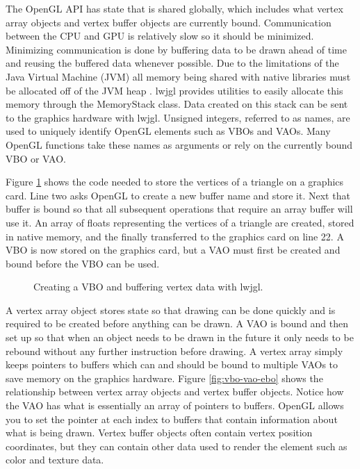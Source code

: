 \documentclass{article}
\begin{document}
The OpenGL API has state that is shared globally, which includes what vertex array objects and vertex buffer objects are currently bound. Communication between the CPU and GPU is relatively slow so it should be minimized. Minimizing communication is done by buffering data to be drawn ahead of time and reusing the buffered data whenever possible. Due to the limitations of the Java Virtual Machine (JVM) all memory being shared with native libraries must be allocated off of the JVM heap \cite{lwjglwiki}. lwjgl provides utilities to easily allocate this memory through the MemoryStack class. Data created on this stack can be sent to the graphics hardware with lwjgl. Unsigned integers, referred to as names, are used to uniquely identify OpenGL elements such as VBOs and VAOs. Many OpenGL functions take these names as arguments or rely on the currently bound VBO or VAO.

Figure \ref{fig:create-vbo} shows the code needed to store the vertices of a triangle on a graphics card. Line two asks OpenGL to create a new buffer name and store it. Next that buffer is bound so that all subsequent operations that require an array buffer will use it. An array of floats representing the vertices of a triangle are created, stored in native memory, and the finally transferred to the graphics card on line 22. A VBO is now stored on the graphics card, but a VAO must first be created and bound before the VBO can be used.

\begin{figure}[h]
	
	\caption{Creating a VBO and buffering vertex data with lwjgl.}
	\label{fig:create-vbo}
\end{figure}

A vertex array object stores state so that drawing can be done quickly and is required to be created before anything can be drawn. A VAO is bound and then set up so that when an object needs to be drawn in the future it only needs to be rebound without any further instruction before drawing. A vertex array simply keeps pointers to buffers which can and should be bound to multiple VAOs to save memory on the graphics hardware. Figure \ref{fig:vbo-vao-ebo} shows the relationship between vertex array objects and vertex buffer objects. Notice how the VAO has what is essentially an array of pointers to buffers. OpenGL allows you to set the pointer at each index to buffers that contain information about what is being drawn. Vertex buffer objects often contain vertex position coordinates, but they can contain other data used to render the element such as color and texture data.
\end{document}
